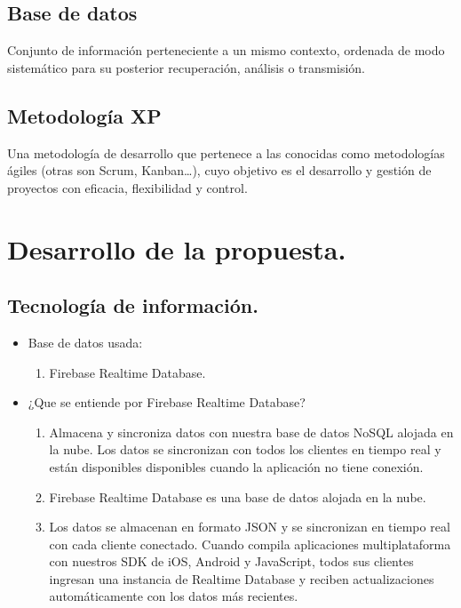 \documentclass[preprint,12pt]{elsarticle}
\begin{document}
\subsection{Base de datos}
Conjunto de información perteneciente a un mismo contexto, ordenada de modo sistemático para su posterior recuperación, análisis o transmisión.
\subsection{Metodología XP}
Una metodología de desarrollo que pertenece a las conocidas como metodologías ágiles (otras son Scrum, Kanban…), cuyo objetivo es el desarrollo y gestión de proyectos con eficacia, flexibilidad y control.


\section{Desarrollo de la propuesta.}
	\subsection{Tecnología de información.}
		\begin{itemize}
			\item Base de datos usada:
				\begin{enumerate}
					\item Firebase Realtime Database.
				\end{enumerate}
			\item ¿Que se entiende por Firebase Realtime Database?
				\begin{enumerate}
					\item Almacena y sincroniza datos con nuestra base de datos NoSQL alojada en la nube. Los datos se sincronizan con todos los clientes en tiempo real y están disponibles disponibles cuando la aplicación no tiene conexión.
					\item Firebase Realtime Database es una base de datos alojada en la nube.
					\item Los datos se almacenan en formato JSON y se sincronizan en tiempo real con cada cliente conectado. Cuando compila aplicaciones multiplataforma con nuestros SDK de iOS, Android y JavaScript, todos sus clientes ingresan una instancia de Realtime Database y reciben actualizaciones automáticamente con los datos más recientes.
				\end{enumerate}
		\end{itemize}
\end{document}
